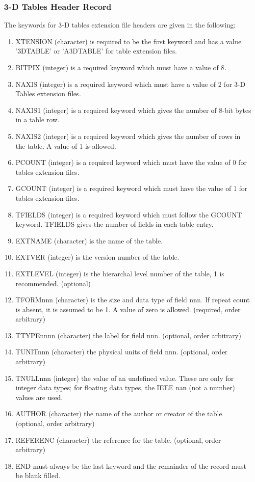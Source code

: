 \subsubsection{3-D Tables Header Record }
The keywords for 3-D tables extension file headers are given in the
following:
\begin{enumerate} %
\item XTENSION (character) is required to be the first keyword and has a
value '3DTABLE' or 'A3DTABLE' for table extension files.
\item BITPIX (integer) is a required keyword which must have a value of 8.
\item NAXIS (integer) is a required keyword which must have a value of 2 for
3-D Tables extension files.
\item NAXIS1 (integer) is a required keyword which gives the number of 8-bit
bytes in a table row.
\item NAXIS2 (integer) is a required keyword which gives the number of rows
in the table.  A value of 1 is allowed.
\item PCOUNT (integer) is a required keyword which must have the value of 0
for tables extension files.
\item GCOUNT (integer) is a required keyword which must have the value of 1
for tables extension files.
\item TFIELDS (integer) is a required keyword which must follow the GCOUNT
keyword.  TFIELDS gives the number of fields in each table entry.
\item EXTNAME (character) is the name of the table.
\item EXTVER (integer) is the version number of the table.
\item EXTLEVEL (integer) is the hierarchal level number of the table, 1 is
recommended. (optional)
\item TFORMnnn (character) is the size and data type of field nnn. If repeat
count is absent, it is assumed to be 1.  A value of zero is allowed.
(required, order arbitrary)
\item TTYPEnnnn (character) the label for field nnn.  (optional, order
arbitrary)
\item TUNITnnn (character) the physical units of field nnn.  (optional,
order arbitrary)
\item TNULLnnn (integer) the value of an undefined value.  These are only
for integer data types; for floating data types, the IEEE nan (not a
number) values are used.
\item AUTHOR (character) the name of the author or creator of the table.
(optional, order arbitrary)
\item REFERENC (character) the reference for the table.  (optional, order
arbitrary)
\item END must always be the last keyword and the remainder of the record
must be blank filled.
\end{enumerate} %

